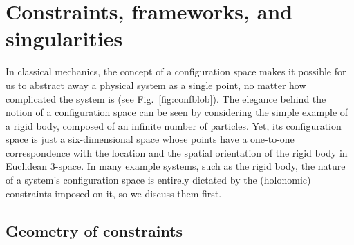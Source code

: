 
\chapter[Constraints, frameworks, and singularities]{Constraints, frameworks, and singularities}
  \label{chap02}


In classical mechanics, the concept of a configuration space makes it possible for us to abstract away a physical system as a single point, no matter how complicated the system is (see Fig.~\ref{fig:confblob}).
The elegance behind the notion of a configuration space can be seen by considering the simple example of a rigid body, composed of an infinite number of particles.
Yet, its configuration space is just a six-dimensional space whose points have a one-to-one correspondence with the location and the spatial orientation of the rigid body in Euclidean 3-space.
In many example systems, such as the rigid body, the nature of a system's configuration space is entirely dictated by the (holonomic) constraints imposed on it, so we discuss them first.

\section{Geometry of constraints}
\label{sec:constraints}

